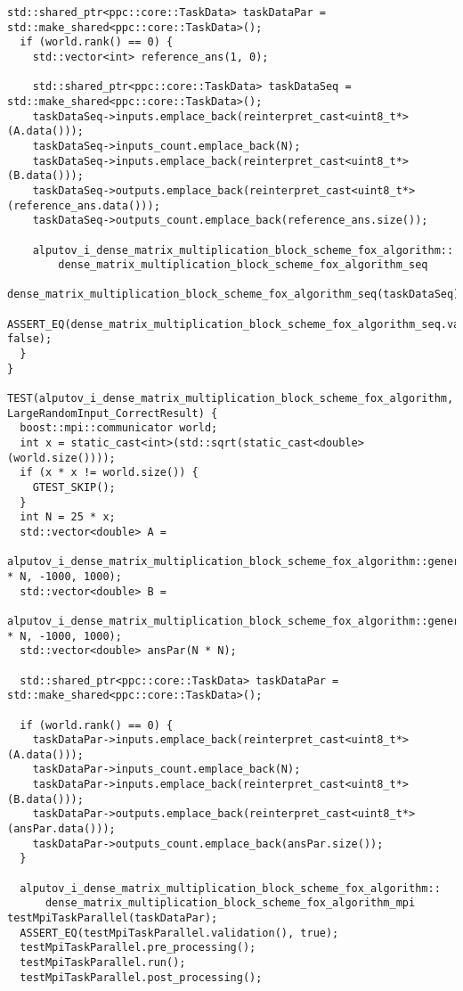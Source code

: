 \documentclass{report}
\begin{document}
\begin{lstlisting}[caption={main.cpp(func tests)},label=lst:opsmpi2]
  std::shared_ptr<ppc::core::TaskData> taskDataPar = std::make_shared<ppc::core::TaskData>();
  if (world.rank() == 0) {
    std::vector<int> reference_ans(1, 0);

    std::shared_ptr<ppc::core::TaskData> taskDataSeq = std::make_shared<ppc::core::TaskData>();
    taskDataSeq->inputs.emplace_back(reinterpret_cast<uint8_t*>(A.data()));
    taskDataSeq->inputs_count.emplace_back(N);
    taskDataSeq->inputs.emplace_back(reinterpret_cast<uint8_t*>(B.data()));
    taskDataSeq->outputs.emplace_back(reinterpret_cast<uint8_t*>(reference_ans.data()));
    taskDataSeq->outputs_count.emplace_back(reference_ans.size());

    alputov_i_dense_matrix_multiplication_block_scheme_fox_algorithm::
        dense_matrix_multiplication_block_scheme_fox_algorithm_seq
            dense_matrix_multiplication_block_scheme_fox_algorithm_seq(taskDataSeq);
    ASSERT_EQ(dense_matrix_multiplication_block_scheme_fox_algorithm_seq.validation(), false);
  }
}

TEST(alputov_i_dense_matrix_multiplication_block_scheme_fox_algorithm, LargeRandomInput_CorrectResult) {
  boost::mpi::communicator world;
  int x = static_cast<int>(std::sqrt(static_cast<double>(world.size())));
  if (x * x != world.size()) {
    GTEST_SKIP();
  }
  int N = 25 * x;
  std::vector<double> A =
      alputov_i_dense_matrix_multiplication_block_scheme_fox_algorithm::generator(N * N, -1000, 1000);
  std::vector<double> B =
      alputov_i_dense_matrix_multiplication_block_scheme_fox_algorithm::generator(N * N, -1000, 1000);
  std::vector<double> ansPar(N * N);

  std::shared_ptr<ppc::core::TaskData> taskDataPar = std::make_shared<ppc::core::TaskData>();

  if (world.rank() == 0) {
    taskDataPar->inputs.emplace_back(reinterpret_cast<uint8_t*>(A.data()));
    taskDataPar->inputs_count.emplace_back(N);
    taskDataPar->inputs.emplace_back(reinterpret_cast<uint8_t*>(B.data()));
    taskDataPar->outputs.emplace_back(reinterpret_cast<uint8_t*>(ansPar.data()));
    taskDataPar->outputs_count.emplace_back(ansPar.size());
  }

  alputov_i_dense_matrix_multiplication_block_scheme_fox_algorithm::
      dense_matrix_multiplication_block_scheme_fox_algorithm_mpi testMpiTaskParallel(taskDataPar);
  ASSERT_EQ(testMpiTaskParallel.validation(), true);
  testMpiTaskParallel.pre_processing();
  testMpiTaskParallel.run();
  testMpiTaskParallel.post_processing();


\end{lstlisting}
\end{document}
